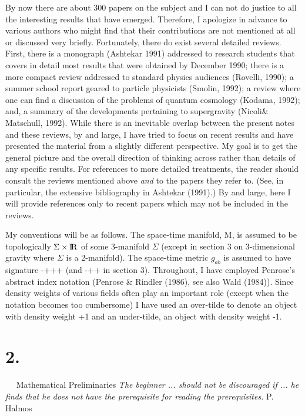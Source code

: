 By now there are about 300 papers on the subject and I can not do justice
to all the interesting results that have emerged. Therefore, I apologize in
advance to various authors who might find that their contributions are
not mentioned at all or discussed very briefly. Fortunately, there do exist
several detailed reviews. First, there is a monograph (Ashtekar 1991)
addressed to research students that covers in detail most results that were
obtained by December 1990; there is a more compact review addressed to
standard physics audiences (Rovelli, 1990); a summer school report geared to
particle physicists (Smolin, 1992); a review where one can find a discussion
of the problems of quantum cosmology (Kodama, 1992); and, a summary of the
developments pertaining to supergravity (Nicoli\& Matschull, 1992). While
there is an inevitable overlap between the present notes and these reviews,
by and large, I have tried to focus on recent results and have presented
the material from a slightly different perspective. My goal is to get the
general picture and the overall direction of thinking across rather than
details of any specific results. For references to more detailed treatments,
the reader should consult the reviews mentioned above {\it and} to the papers
they refer to. (See, in particular, the extensive bibliography in Ashtekar
(1991).) By and large, here I will provide references only to recent papers
which may not be included in the reviews.

My conventions will be as follows. The space-time manifold, M, is assumed
to be topologically $\Sigma\times{\rm I\!R}$ of some 3-manifold $\Sigma$
(except in section 3 on 3-dimensional gravity where $\Sigma$ is a 2-manifold).
The space-time metric $g_{ab}$ is assumed to have signature -+++ (and
-++ in section 3). Throughout, I have employed Penrose's abstract index
notation (Penrose \& Rindler (1986), see also Wald (1984)). Since density
weights of various fields often play an important role (except when the
notation becomes too cumbersome) I have used an over-tilde to denote an object
with density weight +1 and an under-tilde, an object with density weight -1.

\vfill\break
%
\section{2.}{${}\quad$ Mathematical Preliminaries}
\medskip
{\narrower\narrower\smallskip\noindent
{\sl The beginner ... should not be discouraged if ... he finds
 that he does not have the prerequisite for reading the  prerequisites.}
\smallskip
P. Halmos\smallskip}
\medskip

